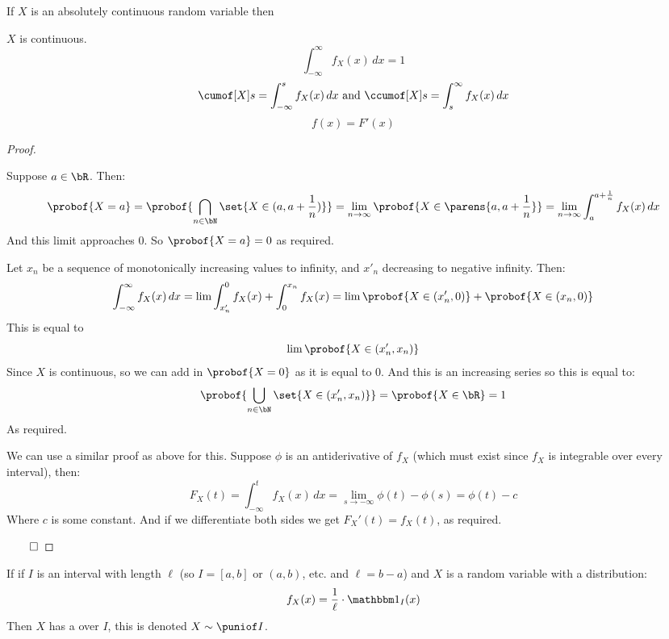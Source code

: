 \begin{prop*}

	If $X$ is an absolutely continuous random variable then
	\begin{msecenumerate}
		\mitem $X$ is continuous.
		\mitem \[ \int_{-\infty}^\infty f_X(x)\,dx = 1 \]
		\mitem \[ \cumof[X]s = \int_{-\infty}^s f_X(x)\,dx \text{ and } \ccumof[X]s = \int_s^\infty f_X(x)\,dx \]
		\mitem \[ f(x) = F'(x) \]
	\end{msecenumerate}

\end{prop*}

\begin{proof}

	\begin{msecenumerate}[0pt]
		\mitem Suppose $a\in\bR$.
			Then:
			\[ \probof{X=a} = \probof{\bigcap_{n\in\bN}\set{X\in(a,a+\frac1n)}} = \lim_{n\to\infty}\probof{X\in\parens{a,a+\frac1n}} =
			\lim_{n\to\infty}\int_a^{a+\frac1n}f_X(x)\,dx \]
			And this limit approaches $0$.
			So $\probof{X=a}=0$ as required.

		\mitem Let $x_n$ be a sequence of monotonically increasing values to infinity, and $x'_n$ decreasing to negative infinity.
			Then:
			\[ \int_{-\infty}^\infty f_X(x)\,dx = \lim \int_{x'_n}^0 f_X(x) + \int_0^{x_n} f_X(x) = \lim \probof{X\in(x'_n,0)} + \probof{X\in(x_n,0)} \]
			This is equal to
			\[ \lim\probof{X\in(x'_n,x_n)} \]
			Since $X$ is continuous, so we can add in $\probof{X=0}$ as it is equal to $0$.
			And this is an increasing series so this is equal to:
			\[ \probof{\bigcup_{n\in\bN}\set{X\in(x'_n,x_n)}} = \probof{X\in\bR} = 1 \]
			As required.

		\mitem We can use a similar proof as above for this.
		\mitem Suppose $\phi$ is an antiderivative of $f_X$ (which must exist since $f_X$ is integrable over every interval), then:
			\[ F_X(t) = \int_{-\infty}^t f_X(x)\,dx = \lim_{s\to-\infty}\phi(t)-\phi(s) = \phi(t) - c \]
			Where $c$ is some constant.
			And if we differentiate both sides we get $F_X'(t)=f_X(t)$, as required.
	\end{msecenumerate}

	\hfill$\qed$

\end{proof}

\begin{defn*}

	If if $I$ is an interval with length $\ell$ (so $I=[a,b]$ or $(a,b)$, etc. and $\ell=b-a$) and $X$ is a random variable with a distribution:
	\[ f_X(x) = \frac1\ell\cdot\bone_{I}(x) \]
	Then $X$ has a  over $I$, this is denoted $X\sim\puniof I$.

\end{defn*}

